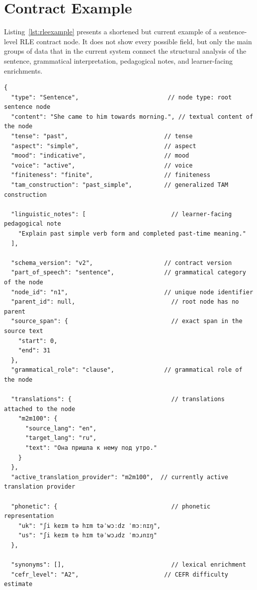 \documentclass[12pt,a4paper,oneside]{report}
\begin{document}
\section{Contract Example}
Listing~\ref{lst:rleexample} presents a shortened but current example of a sentence-level RLE contract node. It does not show every possible field, but only the main groups of data that in the current system connect the structural analysis of the sentence, grammatical interpretation, pedagogical notes, and learner-facing enrichments.

\begin{lstlisting}[style=jsonstyle,caption={Current sentence-level RLE contract example},label={lst:rleexample}]
{
  "type": "Sentence",                         // node type: root sentence node
  "content": "She came to him towards morning.", // textual content of the node
  "tense": "past",                           // tense
  "aspect": "simple",                        // aspect
  "mood": "indicative",                      // mood
  "voice": "active",                         // voice
  "finiteness": "finite",                    // finiteness
  "tam_construction": "past_simple",         // generalized TAM construction

  "linguistic_notes": [                        // learner-facing pedagogical note
    "Explain past simple verb form and completed past-time meaning."
  ],

  "schema_version": "v2",                    // contract version
  "part_of_speech": "sentence",              // grammatical category of the node
  "node_id": "n1",                           // unique node identifier
  "parent_id": null,                           // root node has no parent
  "source_span": {                             // exact span in the source text
    "start": 0,
    "end": 31
  },
  "grammatical_role": "clause",              // grammatical role of the node

  "translations": {                            // translations attached to the node
    "m2m100": {
      "source_lang": "en",
      "target_lang": "ru",
      "text": "Она пришла к нему под утро."
    }
  },
  "active_translation_provider": "m2m100",  // currently active translation provider

  "phonetic": {                                // phonetic representation
    "uk": "ʃi keɪm tə hɪm təˈwɔːdz ˈmɔːnɪŋ",
    "us": "ʃi keɪm tə hɪm təˈwɔɹdz ˈmɔɹnɪŋ"
  },

  "synonyms": [],                              // lexical enrichment
  "cefr_level": "A2",                        // CEFR difficulty estimate


\end{lstlisting}
\end{document}
